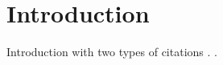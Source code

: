 
\chapter{Introduction} %
\label{cha:introduction}
Introduction with two types of citations \citep{Ogunnaike1994}. \cite{Ogunnaike1994}.






